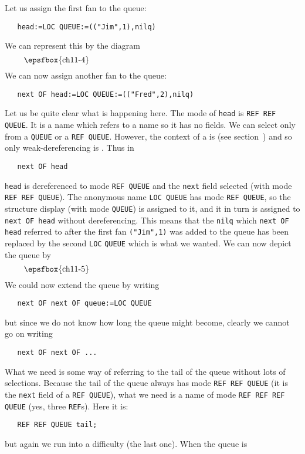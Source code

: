 Let us assign the first fan to the queue:
\begin{verbatim}
   head:=LOC QUEUE:=(("Jim",1),nilq)
\end{verbatim}
\noindent
We can represent this by the diagram
$$\vbox{\epsfbox{ch11-4}}$$
We can now assign another fan to the queue:
\begin{verbatim}
   next OF head:=LOC QUEUE:=(("Fred",2),nilq)
\end{verbatim}
\noindent
Let us be quite clear what is happening here. The mode of \verb|head|
is \verb|REF REF QUEUE|. It is a name which refers to a name so it has no
fields. We can select  only from a
\verb|QUEUE| or a \verb|REF QUEUE|. However, the context of a
 is (see
section~) and so only weak-dereferencing is
. Thus in
\begin{verbatim}
   next OF head
\end{verbatim}
\noindent
\verb|head| is dereferenced to mode \verb|REF QUEUE| and the
\verb|next| field selected (with mode \verb|REF REF QUEUE|). The
anonymous name \verb|LOC QUEUE| has mode \verb|REF QUEUE|, so the
structure display (with mode \verb|QUEUE|) is assigned to it, and it
in turn is assigned to \verb|next OF head| without dereferencing.
This means that the \verb|nilq| which \verb|next OF head| referred to
after the first fan \verb|("Jim",1)| was added to the queue has been
replaced by the second \verb|LOC| \verb|QUEUE| which is what we
wanted. We can now depict the queue by
$$\vbox{\epsfbox{ch11-5}}$$
We could now extend the queue by writing
\begin{verbatim}
   next OF next OF queue:=LOC QUEUE
\end{verbatim}
\noindent
but since we do not know how long the queue might become, clearly we
cannot go on writing
\begin{verbatim}
   next OF next OF ...
\end{verbatim}
\noindent
What we need is some way of referring to the tail of the queue without
lots of selections. Because the tail of the queue always has mode
\verb|REF REF QUEUE| (it is the \verb|next| field of a
\verb|REF QUEUE|), what we need is a name of mode
\verb|REF REF REF QUEUE| (yes, three \verb|REF|s). Here it is:
\begin{verbatim}
   REF REF QUEUE tail;
\end{verbatim}
\noindent
but again we run into a difficulty (the last one). When the queue is
